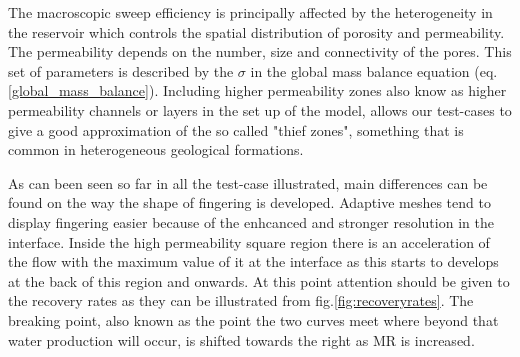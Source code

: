 \documentclass[preprint,authoryear,12pt]{elsarticle}
\begin{document}
{

\medskip
The macroscopic sweep efficiency is principally affected by the heterogeneity in the reservoir which controls the spatial distribution of porosity and permeability. The permeability depends on the number, size and connectivity of the pores. This set of parameters is described by the $\sigma$ in the global mass balance equation (eq.\ref{global_mass_balance}). Including higher permeability zones also know as higher permeability channels or layers in the set up of the model, allows our test-cases to give a good approximation of the so called "thief zones", something that is common in heterogeneous geological formations.

\medskip 
As can been seen so far in all the test-case illustrated, main differences can be found on the way the shape of fingering is developed. Adaptive meshes tend to display fingering easier because of the enhcanced and stronger resolution in the interface. Inside the high permeability square region there is an acceleration of the flow with the maximum value of it at the interface as this starts to develops at the back of this region and onwards. At this point attention should be given to the recovery rates as they can be illustrated from fig.{\ref{fig:recoveryrates}}. The breaking point, also known as the point the two curves meet where beyond that water production will occur, is shifted towards the right as MR is increased.

}
\end{document}
